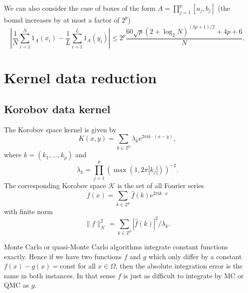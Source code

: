 \documentclass[12pt]{article}
\begin{document}
We can also consider the case of boxes of the form $A  = \prod_{j=1}^p [a_j, b_j]$ (the bound increases by at most a factor of $2^p$)
\begin{equation*}
\left| \frac{1}{N} \sum_{i=1}^N 1_A(x_i) -  \frac{1}{L} \sum_{i=1}^L 1_{A}(y_i)  \right| \le 2^p \frac{ 60 \sqrt{p} (2 + \log_2 N)^{(3p+1)/2} + 4p + 6 }{N}.
\end{equation*}

\section{Kernel data reduction}


\subsection*{Korobov data kernel}

The Korobov space kernel is given by
\begin{equation*}
K(x,y) = \sum_{k \in \mathbb{Z}^p} \lambda_k \mathrm{e}^{2\pi \mathrm{i} k \cdot (x-y)},
\end{equation*}
where $k = (k_1, \ldots, k_p)$ and
\begin{equation*}
\lambda_k =  \prod_{j=1}^p \left( \max(1, 2 \pi |k_j|) \right)^{-2}.
\end{equation*}
The corresponding Korobov space $\mathcal{K}$ is the set of all Fourier series
\begin{equation}\label{eqFS}
f(x) = \sum_{k \in \mathbb{Z}^p} \widehat{f}(k) \mathrm{e}^{2\pi \mathrm{i} k \cdot x}
\end{equation}
with finite norm
\begin{equation*}
\|f\|_{\mathcal{K}}^2 = \sum_{k \in \mathbb{Z}^p} |\widehat{f}(k)|^2/\lambda_k.
\end{equation*}

Monte Carlo or quasi-Monte Carlo algorithms integrate constant functions exactly. Hence if we have two functions $f$ and $g$ which only differ by a constant $f(x) - g(x) = \mathrm{const}$ for all $x \in \Omega$, then the absolute integration error is the same in both instances. In that sense $f$ is just as difficult to integrate by MC or QMC as $g$.
\end{document}
